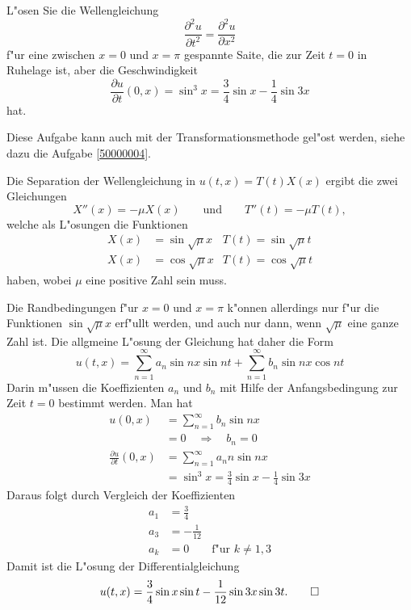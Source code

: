 L"osen Sie die Wellengleichung
\[
\frac{\partial^2 u}{\partial t^2}=\frac{\partial^2 u}{\partial x^2}
\]
f"ur eine zwischen $x=0$ und $x=\pi$ gespannte Saite,
die zur Zeit $t=0$ in Ruhelage ist, aber die Geschwindigkeit
\[
\frac{\partial u}{\partial t}(0, x)
=
\sin^3 x=\frac34\sin x-\frac14\sin 3x
\]
hat.

\begin{hinweis}
Diese Aufgabe kann auch mit der Transformationsmethode gel"ost werden,
siehe dazu die Aufgabe \ref{50000004}.
\end{hinweis}

\begin{loesung}
Die Separation der Wellengleichung in $u(t,x)=T(t)X(x)$ ergibt die
zwei Gleichungen
\[
X''(x)=-\mu X(x)\qquad\text{und}\qquad T''(t)=-\mu T(t),
\]
welche als L"osungen die Funktionen
\begin{align*}
X(x)&=\sin\sqrt{\mu}x & T(t)=\sin\sqrt{\mu}t\\
X(x)&=\cos\sqrt{\mu}x & T(t)=\cos\sqrt{\mu}t
\end{align*}
haben, wobei $\mu$ eine positive Zahl sein muss.

Die Randbedingungen f"ur $x=0$ und $x=\pi$ k"onnen allerdings nur
f"ur die Funktionen $\sin\sqrt{\mu}x$ erf"ullt werden, und auch nur dann,
wenn $\sqrt{\mu}$ eine ganze Zahl ist. Die allgmeine L"osung der Gleichung
hat daher die Form
\[
u(t,x)
=
\sum_{n=1}^\infty a_n\sin nx \sin nt+\sum_{n=1}^\infty b_n\sin nx\cos nt
\]
Darin m"ussen die Koeffizienten $a_n$ und $b_n$ mit Hilfe der 
Anfangsbedingung zur Zeit $t=0$ bestimmt werden. Man hat
\begin{align*}
u(0,x)&=
\sum_{n=1}^\infty b_n\sin nx
\\
&=0\quad\Rightarrow\quad b_n=0
\\
\frac{\partial u}{\partial t}(0,x)
&=
\sum_{n=1}^\infty a_nn\sin nx
\\
&=
\sin^3 x=\frac34\sin x-\frac14\sin 3x
\end{align*}
Daraus folgt durch Vergleich der Koeffizienten
\begin{align*}
a_1&=\frac34\\
a_3&=-\frac{1}{12}\\
a_k&=0\qquad\text{f"ur $k\ne 1,3$}
\end{align*}
Damit ist die L"osung der Differentialgleichung
\[
u(t,x)
= \frac34\sin x \sin t -\frac1{12}\sin 3x \sin 3t.
\qedhere
\]
\end{loesung}

